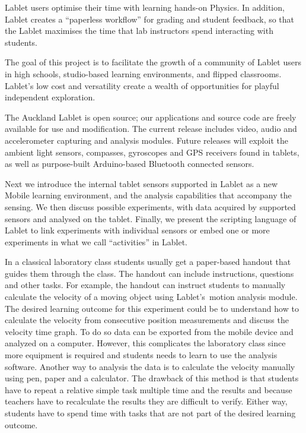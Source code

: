 \documentclass{sigchi}
\newcommand{\lablets}{Lablet's\ }
\begin{document}
Lablet users optimise their time with learning hands-on Physics.  In
addition, Lablet creates a “paperless workflow” for grading and
student feedback, so that the Lablet maximises the time that lab
instructors spend interacting with students.

The goal of this project is to facilitate the growth of a community of
Lablet users in high schools, studio-based learning
environments, and flipped classrooms.  Lablet’s low cost and
versatility create a wealth of opportunities for playful independent
exploration.  

The Auckland Lablet is open source; our applications and source code
are freely available for use and modification.  The current release
includes video, audio and accelerometer capturing and analysis
modules.  Future releases will exploit the ambient light sensors,
compasses, gyroscopes and GPS receivers found in tablets, as well as
purpose-built Arduino-based Bluetooth connected sensors.

Next we introduce the internal tablet sensors supported in Lablet as a
new Mobile learning environment, and the analysis capabilities that
accompany the sensing. We then discuss possible experiments, with data
acquired by supported sensors and analysed on the tablet. Finally, we
present the scripting language of Lablet to link experiments with
individual sensors or embed one or more experiments in what we call
``activities'' in Lablet.

In a classical laboratory class students usually get a paper-based handout that guides them through the class.
The handout can include instructions, questions and other tasks.
For example, the handout can instruct students to manually calculate the velocity of a moving object using \lablets motion analysis module.
The desired learning outcome for this experiment could be to understand how to calculate the velocity from consecutive position measurements and discuss the velocity time graph.
To do so data can be exported from the mobile device and analyzed on a computer.
However, this complicates the laboratory class since more equipment is required and students needs to learn to use the analysis software.
Another way to analysis the data is to calculate the velocity manually using pen, paper and a
calculator.
The drawback of this method is that students have to repeat a relative simple task multiple time and the results and because teachers have to recalculate the results they are difficult to verify.
Either way, students have to spend time with tasks that are not part of the desired learning outcome.
\end{document}
